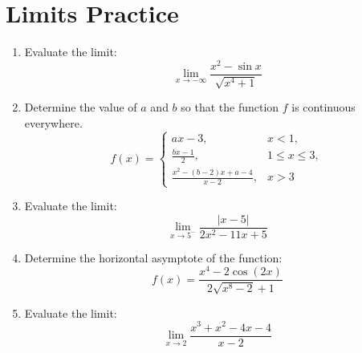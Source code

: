 \section*{Limits Practice}

\begin{enumerate}
\item Evaluate the limit:
$$\displaystyle \lim_{x \to -\infty}{\frac{x^2 - \sin{x}}{\sqrt{x^4 + 1}}}$$

\begin{item}

\end{item}

\item Determine the value of $a$ and $b$ so that the function $f$ is continuous everywhere. $$\displaystyle f(x) = \begin{cases}
    ax - 3, & x < 1, \\[10pt]
    \frac{bx - 1}{2}, & 1 \leq x \leq 3, \\[10pt]
    \frac{x^2 - (b - 2)x + a - 4}{x - 2}, & x > 3
\end{cases}$$

\item Evaluate the limit: $$\displaystyle \lim_{x \to 5^-}{\frac{|x - 5|}{2x^2 - 11x + 5}}$$

\item Determine the horizontal asymptote of the function: $$\displaystyle f(x) = \frac{x^4 - 2\cos{(2x)}}{2\sqrt{x^8 - 2} + 1}$$

\item Evaluate the limit: $$\displaystyle \lim_{x \to 2}\frac{x^3 + x^2 - 4x - 4}{x - 2}$$
\end{enumerate}